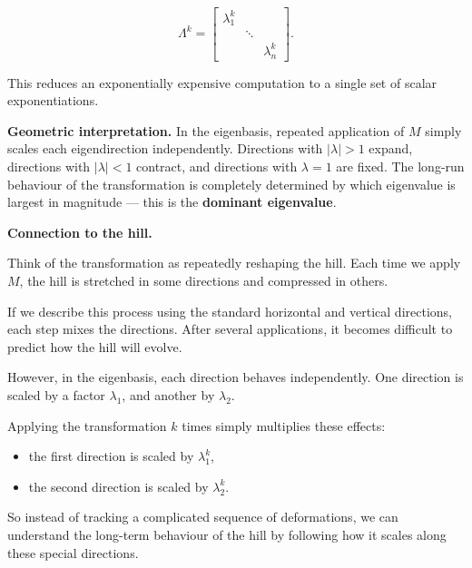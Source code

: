 \documentclass[11pt,openany]{book}
\theoremstyle{definition}
\begin{document}
\[
\Lambda^k = \begin{bmatrix} \lambda_1^k & & \\ & \ddots & \\ & & \lambda_n^k \end{bmatrix}.
\]

This reduces an exponentially expensive computation to a single set of scalar 
exponentiations.

\medskip

\textbf{Geometric interpretation.} In the eigenbasis, repeated application of $M$ 
simply scales each eigendirection independently. Directions with $|\lambda| > 1$ 
expand, directions with $|\lambda| < 1$ contract, and directions with $\lambda = 1$ 
are fixed. The long-run behaviour of the transformation is completely determined by 
which eigenvalue is largest in magnitude --- this is the \textbf{dominant eigenvalue}.

\medskip

\textbf{Connection to the hill.}

\medskip

Think of the transformation as repeatedly reshaping the hill. Each time we apply $M$, 
the hill is stretched in some directions and compressed in others.

\medskip

If we describe this process using the standard horizontal and vertical directions, 
each step mixes the directions. After several applications, it becomes difficult to 
predict how the hill will evolve.

\medskip

However, in the eigenbasis, each direction behaves independently. One direction 
is scaled by a factor $\lambda_1$, and another by $\lambda_2$.

\medskip

Applying the transformation $k$ times simply multiplies these effects:

\begin{itemize}
  \item the first direction is scaled by $\lambda_1^k$,
  \item the second direction is scaled by $\lambda_2^k$.
\end{itemize}

\medskip

So instead of tracking a complicated sequence of deformations, we can understand 
the long-term behaviour of the hill by following how it scales along these special directions.
\end{document}
